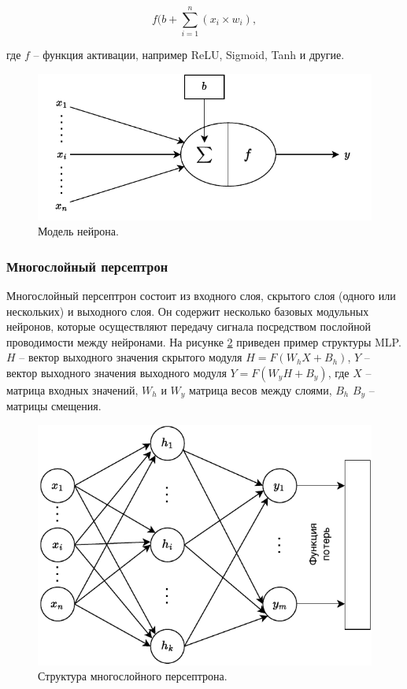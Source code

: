 \begin{equation}
f(b + \sum_{i=1}^{n}(x_i \times w_i),
\end{equation}

где $f$ -- функция активации, например ReLU, Sigmoid, Tanh и другие.

\begin{figure}[hbtp]
	\centering
	\includegraphics[width=\textwidth]{img/neuron.pdf}
	\caption{Модель нейрона.}
	\label{fig:neuron}
\end{figure}




\subsubsection{Многослойный персептрон}

Многослойный персептрон состоит из входного слоя, скрытого слоя (одного или нескольких) и выходного слоя. Он содержит несколько базовых модульных нейронов, которые осуществляют передачу сигнала посредством послойной проводимости между нейронами. На рисунке \ref{fig:mlp} приведен пример структуры MLP. $H$ -- вектор выходного значения скрытого модуля $H=F(W_{h}X+B_h)$, $Y$ -- вектор выходного значения выходного модуля $Y=F(W_{y}H+B_y)$, где $X$ -- матрица входных значений, $W_h$ и $W_y$ матрица весов между слоями, $B_h$ $B_y$ -- матрицы смещения.

\begin{figure}[hbtp]
	\centering
	\includegraphics[width=\textwidth]{img/mlp.pdf}
	\caption{Структура многослойного персептрона.}
	\label{fig:mlp}
\end{figure}


